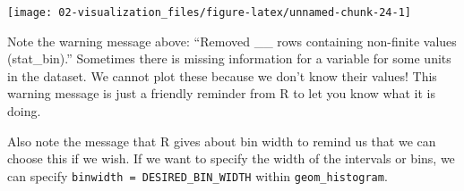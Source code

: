 \documentclass[
]{book}
\newenvironment{Shaded}{\begin{snugshade}}{\end{snugshade}}
\newcommand{\DataTypeTok}[1]{\textcolor[rgb]{0.13,0.29,0.53}{#1}}
\newcommand{\DecValTok}[1]{\textcolor[rgb]{0.00,0.00,0.81}{#1}}
\newcommand{\KeywordTok}[1]{\textcolor[rgb]{0.13,0.29,0.53}{\textbf{#1}}}
\newcommand{\NormalTok}[1]{#1}
\newcommand{\OperatorTok}[1]{\textcolor[rgb]{0.81,0.36,0.00}{\textbf{#1}}}
\newcommand{\StringTok}[1]{\textcolor[rgb]{0.31,0.60,0.02}{#1}}
\begin{document}
\begin{Shaded}
\end{Shaded}

\begin{center}\texttt{[image: 02-visualization\_files/figure-latex/unnamed-chunk-24-1]} \end{center}

Note the warning message above: ``Removed \_\_ rows containing non-finite values (stat\_bin).'' Sometimes there is missing information for a variable for some units in the dataset. We cannot plot these because we don't know their values! This warning message is just a friendly reminder from R to let you know what it is doing.

Also note the message that R gives about bin width to remind us that we can choose this if we wish. If we want to specify the width of the intervals or bins, we can specify \texttt{binwidth\ =\ DESIRED\_BIN\_WIDTH} within \texttt{geom\_histogram}.

\begin{Shaded}
\end{Shaded}
\end{document}
